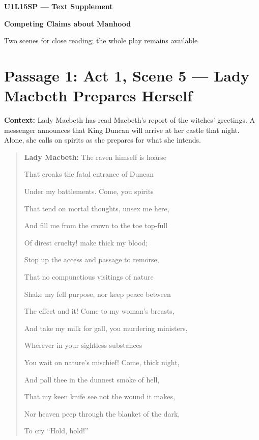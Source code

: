 \documentclass[11pt]{article}
\newenvironment{playpassage}{\begin{quote}\small\setlength{\parskip}{0.05em}\setlength{\parindent}{0pt}}{\end{quote}}
\newcommand{\speaker}[1]{\textbf{#1:}}
\begin{document}
\begin{center}
{\Large\bfseries U1L15SP --- Text Supplement}\par
{\LARGE\bfseries Competing Claims about Manhood}\par
{\large Two scenes for close reading; the whole play remains available}
\end{center}

\section*{Passage 1: Act 1, Scene 5 --- Lady Macbeth Prepares Herself}
\textbf{Context:} Lady Macbeth has read Macbeth's report of the witches' greetings. A messenger announces that King Duncan will arrive at her castle that night. Alone, she calls on spirits as she prepares for what she intends.
\begin{playpassage}
\speaker{Lady Macbeth} The raven himself is hoarse\par
That croaks the fatal entrance of Duncan\par
Under my battlements. Come, you spirits\par
That tend on mortal thoughts, unsex me here,\par
And fill me from the crown to the toe top-full\par
Of direst cruelty! make thick my blood;\par
Stop up the access and passage to remorse,\par
That no compunctious visitings of nature\par
Shake my fell purpose, nor keep peace between\par
The effect and it! Come to my woman's breasts,\par
And take my milk for gall, you murdering ministers,\par
Wherever in your sightless substances\par
You wait on nature's mischief! Come, thick night,\par
And pall thee in the dunnest smoke of hell,\par
That my keen knife see not the wound it makes,\par
Nor heaven peep through the blanket of the dark,\par
To cry ``Hold, hold!''
\end{playpassage}
\end{document}

